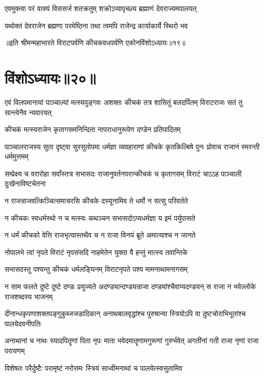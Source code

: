 \twolineshloka
{एवमुक्त्वा परं वाक्यं विससर्ज शतक्रतुम्}
{शक्रोऽप्यापृच्छ्य ब्रह्माणं देवराज्यमपालयत्}


\twolineshloka
{यथोक्तं देवराजेन ब्रह्मणा परमेष्ठिना}
{तथा त्वमपि राजेन्द्र कार्याकार्ये स्थिरो भव}

॥इति श्रीमन्महाभारते विराटपर्वणि कीचकवधपर्वणि एकोनविंशोऽध्यायः॥१९॥

\chapter{विंशोऽध्यायः॥२०॥}

\threelineshloka
{एवं विलपमानायां पाञ्चाल्यां मत्स्यपुङ्गवः}
{अशक्तः कीचकं तत्र शासितुं बलदर्पितम्}
{विराटराजः सतं तु सान्त्वेनैव न्यवारयत्}


\twolineshloka
{कीचकं मत्स्यराजेन कृतागसमनिन्दिता}
{नापराधानुरूपेण दण्डेन प्रतिपादितम्}


\threelineshloka
{पाञ्चालराजस्य सुता दृष्ट्वा सुरसुतोपमा}
{धर्मज्ञा व्यवहाराणां कीचके कृतकिल्बिषे}
{पुनः प्रोवाच राजानं स्मरन्ती धर्ममुत्तमम्}


\threelineshloka
{सम्प्रेक्ष्य च वरारोहा सर्वांस्तत्र सभासदः}
{राजानुवर्तनपरान्कीचकं च कृतागसम्}
{विराटं चाऽऽह पाञ्चाली दुःखेनाविष्टचेतना}


\twolineshloka
{न राजन्राजवत्किञ्चित्समाचरसि कीचके}
{दस्यूनामिव ते धर्मो न सत्सु परिवर्तते}


\twolineshloka
{न कीचकः स्वधर्मस्थो न च मत्स्यः कथञ्चन}
{सभासदोऽप्यधर्मज्ञा य इमं पर्युपासते}


\twolineshloka
{न धर्मं कीचको वेत्ति राजभृत्यास्तथैव च}
{न राजा विनयं ब्रूते अमात्याश्च न जानते}


\twolineshloka
{नोपालभे त्वां नृपते विराटं नृपसंसदि}
{नाहमेतेन युक्ता वै हन्तुं मात्स्य तवान्तिके}


\twolineshloka
{सभासदस्तु पश्यन्तु कीचकं धर्मलङ्घिनम्}
{विराटनृपते पश्य मामनाथामनागसम्}


\onelineshloka
{न साम फलते दुष्टे दुष्टे दण्डः प्रयुज्यते}
\twolineshloka
{अदण्ड्यान्दण्डयन्राजा दण्ड्यांश्चैवाप्यदण्डयन्}
{स राजा न भवेल्लोके राजशब्दस्य भाजनम्}


\threelineshloka
{दीनान्धकृपणाशक्तपङ्गुकुब्जजडादिकान्}
{अनाथबालवृद्धांश्च पुरुषान्वा स्त्रियोऽपि वा}
{दुष्टचोराभिभूतांश्च पालयेदवनीपतिः}


\threelineshloka
{अनाथानां च नाथः स्यादपितॄणां पिता नृपः}
{माता भवेदमातॄणामगुरूणां गुरुर्भवेत्}
{अगतीनां गती राजा नृणां राजा परायणम्}


\twolineshloka
{विशेषतः परैर्दुष्टैः परामृष्टं नरोत्तमः}
{स्त्रियं साध्वीमनाथां च पालयेत्स्वसुतामिव}


